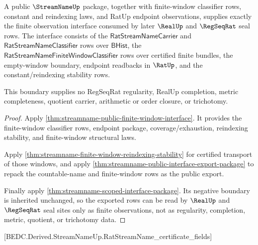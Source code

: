 \begin{theorem}
\label{thm:streamname-realup-finite-window-seal-boundary}
A public $\StreamNameUp$ package, together with finite-window classifier rows,
constant and reindexing laws, and RatUp endpoint observations, supplies exactly
the finite observation interface consumed by later $\RealUp$ and $\RegSeqRat$
seal rows.  The interface consists of the $\mathsf{RatStreamNameCarrier}$ and
$\mathsf{RatStreamNameClassifier}$ rows over $\mathsf{BHist}$, the
$\mathsf{RatStreamNameFiniteWindowClassifier}$ rows over certified finite
bundles, the empty-window boundary, endpoint readbacks in $\RatUp$, and the
constant/reindexing stability rows.

This boundary supplies no RegSeqRat regularity, RealUp completion, metric
completeness, quotient carrier, arithmetic or order closure, or trichotomy.
\end{theorem}
\begin{proof}
Apply \autoref{thm:streamname-public-finite-window-interface}.  It provides the
finite-window classifier rows, endpoint package, coverage/exhaustion,
reindexing stability, and finite-window structural laws.

Apply \autoref{thm:streamname-finite-window-reindexing-stability} for certified
transport of those windows, and apply
\autoref{thm:streamname-public-interface-export-package} to repack the
countable-name and finite-window rows as the public export.

Finally apply \autoref{thm:streamname-scoped-interface-package}.  Its negative
boundary is inherited unchanged, so the exported rows can be read by
$\RealUp$ and $\RegSeqRat$ seal sites only as finite observations, not as
regularity, completion, metric, quotient, or trichotomy data.
\end{proof}

[BEDC.Derived.StreamNameUp.RatStreamName\_certificate\_fields]

